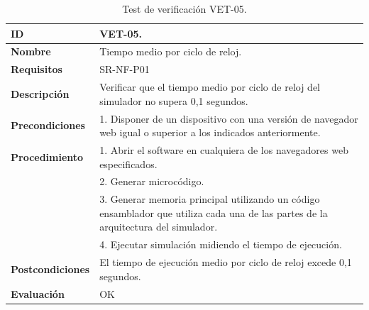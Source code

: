 \begin{center}
\begin{table}[htb]
\centering
\caption{Test de verificación VET-05.}
\begin{tabular}{@{}p{2.5cm} p{13cm}@{}} 
\toprule
\textbf{ID} 					& VET-05. \\
\midrule
\textbf{Nombre} 				& Tiempo medio por ciclo de reloj. \\
\midrule
\textbf{Requisitos} 		& SR-NF-P01\\
\midrule
\textbf{Descripción} 		& Verificar que el tiempo medio por ciclo de reloj del simulador no supera 0,1 segundos. \\
\midrule
\textbf{Precondiciones}		& 1. Disponer de un dispositivo con una versión de navegador web igual o superior a los indicados anteriormente. \\
\midrule
\textbf{Procedimiento}			& 1. Abrir el software en cualquiera de los navegadores web especificados. \\
							& 2. Generar microcódigo.\\
							& 3. Generar memoria principal utilizando un código ensamblador que utiliza cada una de las partes de la arquitectura del simulador.\\
							& 4. Ejecutar simulación midiendo el tiempo de ejecución.\\
\midrule
\textbf{Postcondiciones} 		&  El tiempo de ejecución medio por ciclo de reloj excede 0,1 segundos.\\
\midrule
\textbf{Evaluación} 			& OK \\
\bottomrule
\end{tabular}
\label{tab:vet05}
\end{table}
\end{center}

